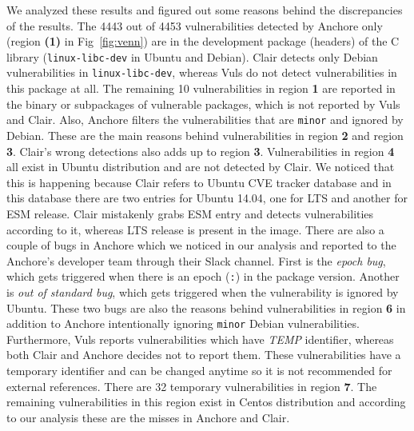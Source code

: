 \documentclass[a4paper,num-refs]{oup-contemporary}
\begin{document}
We analyzed these results and figured out some reasons behind the discrepancies of the results.
The 4443 out of 4453 vulnerabilities detected by Anchore only (region \textbf{(1)} in
Fig~\ref{fig:venn}) are in the development package (headers) of the C
library (\texttt{linux-libc-dev} in Ubuntu and Debian). Clair detects only Debian vulnerabilities
in \texttt{linux-libc-dev}, whereas Vuls do not detect vulnerabilities in this package at all.
The remaining 10 vulnerabilities in region \textbf{1} are reported in the binary or subpackages 
of vulnerable packages, which is not reported by Vuls and Clair.
Also, Anchore filters the vulnerabilities that are \texttt{minor} and 
ignored by Debian. These are the main reasons behind vulnerabilities in 
region \textbf{2} and region \textbf{3}. Clair's wrong detections also adds up to region \textbf{3}.
Vulnerabilities in region \textbf{4} all exist in Ubuntu distribution 
and are not detected by Clair. We noticed that this is happening because Clair refers 
to Ubuntu CVE tracker database and in this database there are two entries for Ubuntu 14.04, 
one for LTS and another for ESM release. Clair mistakenly grabs ESM entry and detects vulnerabilities 
according to it, whereas LTS release is present in the image. There are also a couple of 
bugs in Anchore which we noticed in our analysis and reported to the Anchore's developer 
team through their Slack channel. First is the \textit{epoch bug}, which gets triggered 
when there is an epoch (\texttt{:}) in the package version. Another is \textit{out of standard bug}, 
which gets triggered when the vulnerability is ignored 
by Ubuntu. These two bugs are also the reasons behind vulnerabilities in region \textbf{6} 
in addition to Anchore intentionally ignoring \texttt{minor} Debian vulnerabilities. 
Furthermore, Vuls reports vulnerabilities which have \textit{TEMP} 
identifier, whereas both Clair and Anchore decides not to report them. These 
vulnerabilities have a temporary identifier and can be changed anytime so it is not
recommended for external references. There are 32 temporary vulnerabilities in region \textbf{7}.
The remaining vulnerabilities in this region exist in Centos distribution and according to our analysis
these are the misses in Anchore and Clair.
\end{document}

